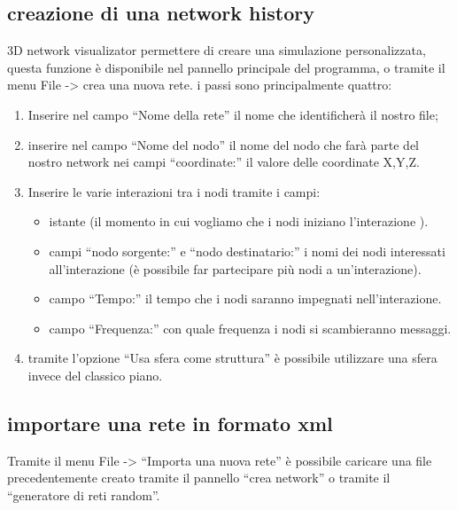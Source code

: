 \documentclass[a4paper,12pt]{article}
\begin{document}
\subsection{creazione di una network history}
3D network visualizator permettere di creare una simulazione  personalizzata, questa funzione \`e disponibile nel pannello principale del programma, o tramite il menu 
File -> crea una nuova rete.
i passi sono principalmente quattro:
\begin{enumerate}
 \item Inserire nel campo “Nome della rete” il nome che identificherà il nostro file;
 \item inserire nel campo “Nome del nodo” il nome del nodo che farà parte del nostro network nei campi “coordinate:” il valore delle coordinate X,Y,Z.
 \item Inserire le varie interazioni tra i nodi tramite i campi: 
  \begin{itemize}
   \item istante (il momento in cui vogliamo che i nodi iniziano l'interazione ). 
   \item campi “nodo sorgente:” e “nodo destinatario:” i nomi dei nodi interessati all'interazione (\`e possibile far partecipare più nodi a un'interazione).
   \item campo “Tempo:” il tempo che i nodi saranno impegnati nell'interazione.
   \item campo “Frequenza:” con quale frequenza i nodi si scambieranno messaggi.
  \end{itemize}
 \item tramite l'opzione “Usa sfera come struttura” \`e possibile utilizzare una sfera invece del classico piano.
\end{enumerate}

\subsection{importare una rete in formato xml}
Tramite il menu File -> “Importa una nuova rete” \`e possibile caricare una file precedentemente creato tramite il pannello “crea network” o tramite il “generatore di reti random”.
\end{document}
